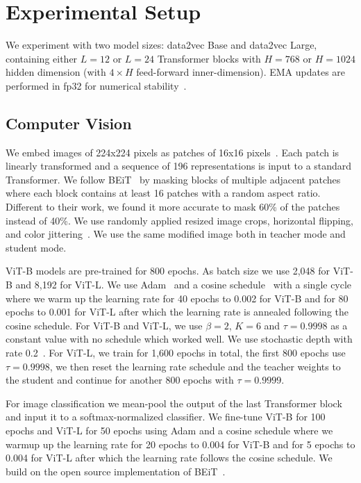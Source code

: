 \documentclass[nohyperref]{article}
\theoremstyle{plain}
\theoremstyle{definition}
\theoremstyle{remark}
\newcommand{\name}{data2vec}
\begin{document}
\section{Experimental Setup}
\label{sec:setup}

We experiment with two model sizes: \name{} Base and \name{} Large, containing either $L=12$ or $L=24$ Transformer blocks with $H=768$ or $H=1024$ hidden dimension (with $4\times H$ feed-forward inner-dimension). 
EMA updates are performed in fp32 for numerical stability~\citep{manohar2021kaizen}.


\subsection{Computer Vision}
\label{sec:setup_cv}

We embed images of 224x224 pixels as patches of 16x16 pixels~\citep{dosovitskiy2020vit}.
Each patch is linearly transformed and a sequence of 196 representations is input to a standard Transformer.
We follow BEiT~\citep{bao2021beit} by masking blocks of multiple adjacent patches where each block contains at least 16 patches with a random aspect ratio.
Different to their work, we found it more accurate to mask 60\% of the patches instead of 40\%.
We use randomly applied resized image crops, horizontal flipping, and color jittering~\citep{bao2021beit}. 
We use the same modified image both in teacher mode and student mode.

ViT-B models are pre-trained for 800 epochs.
As batch size we use 2,048 for ViT-B and 8,192 for ViT-L.
We use Adam~\citep{kingma2015adam} and a cosine schedule~\citep{loshchilov2016cosine} with a single cycle where we warm up the learning rate for 40 epochs to 0.002 for ViT-B and for 80 epochs to 0.001 for ViT-L after which the learning rate is annealed following the cosine schedule.
For ViT-B and ViT-L, we use $\beta=2$, $K=6$ and $\tau = 0.9998$ as a constant value with no schedule which worked well.
We use stochastic depth with rate 0.2~\citep{huang2016deep}.
For ViT-L, we train for 1,600 epochs in total, the first 800 epochs use $\tau=0.9998$, we then reset the learning rate schedule and the teacher weights to the student and continue for another 800 epochs with $\tau=0.9999$.

For image classification we mean-pool the output of the last Transformer block and input it to a softmax-normalized classifier.
We fine-tune ViT-B for 100 epochs and ViT-L for 50 epochs using Adam and a cosine schedule where we warmup up the learning rate for 20 epochs to 0.004 for ViT-B and for 5 epochs to 0.004 for ViT-L after which the learning rate follows the cosine schedule. 
We build on the open source implementation of BEiT~\citep{bao2021beit}.
\end{document}
